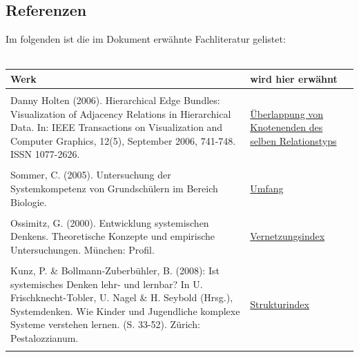 \documentclass[enabledeprecatedfontcommands,fontsize=11pt,paper=a4,twoside]{scrartcl}
\begin{document}
\subsection{Referenzen} 
Im folgenden ist die im Dokument erwähnte Fachliteratur gelistet: \\ \\
\begin{tabular}{p{11cm}p{5cm}}
	Werk & wird hier erwähnt \\ \hline \\
	Danny Holten (2006). Hierarchical Edge Bundles: Visualization of Adjacency Relations in Hierarchical Data. In: IEEE Transactions on Visualization and Computer Graphics, 12(5), September 2006, 741-748. ISSN 1077-2626. & \hyperlink{cc}{Überlappung von Knotenenden des selben Relationstyps} \\ \\ 
	Sommer, C. (2005). Untersuchung der Systemkompetenz von Grundschülern im Bereich Biologie.& \hyperlink{Umfang}{Umfang} \\ \\
	Ossimitz, G. (2000). Entwicklung systemischen Denkens. Theoretische Konzepte und empirische Untersuchungen. München: Profil. & \hyperlink{Vernetzungsindex}{Vernetzungsindex} \\ \\
	Kunz, P. \& Bollmann-Zuberbühler, B. (2008): Ist systemisches Denken lehr- und lernbar? In U. Frischknecht-Tobler, U. Nagel \& H. Seybold (Hrsg.), Systemdenken. Wie Kinder und Jugendliche komplexe Systeme verstehen lernen. (S. 33-52). Zürich: Pestalozzianum. & \hyperlink{Strukturindex}{Strukturindex} \\ \\
\end{tabular}


\newpage
\end{document}
